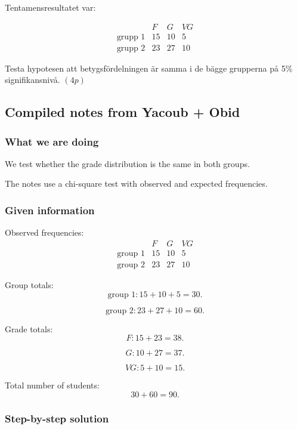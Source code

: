 \documentclass[10pt]{article}
\begin{document}
Tentamensresultatet var:

\[
\begin{array}{c|ccc}
& F & G & VG\\
\hline
\text{grupp 1} & 15 & 10 & 5\\
\text{grupp 2} & 23 & 27 & 10
\end{array}
\]

Testa hypotesen att betygsfördelningen är samma i de
bägge grupperna på 5\% signifikansnivå. \((4p)\)

\subsection*{Compiled notes from Yacoub + Obid}

\subsubsection*{What we are doing}

We test whether the grade distribution is the same
in both groups.

The notes use a chi-square test with observed and
expected frequencies.

\subsubsection*{Given information}

Observed frequencies:
\[
\begin{array}{c|ccc}
& F & G & VG\\
\hline
\text{group 1} & 15 & 10 & 5\\
\text{group 2} & 23 & 27 & 10
\end{array}
\]

Group totals:
\[
\text{group 1}: 15+10+5=30.
\]

\[
\text{group 2}: 23+27+10=60.
\]

Grade totals:
\[
F:15+23=38.
\]

\[
G:10+27=37.
\]

\[
VG:5+10=15.
\]

Total number of students:
\[
30+60=90.
\]

\subsubsection*{Step-by-step solution}
\end{document}
